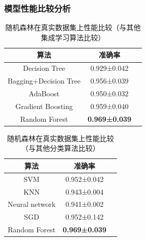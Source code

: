 \documentclass[10pt,aspectratio=43,mathserif]{beamer}
\begin{document}
          \begin{frame}
            \frametitle{\textbf{模型性能比较分析}}
            \begin{table}[]
                \caption{随机森林在真实数据集上性能比较（与其他集成学习算法比较）}
                \label{compare_ensemble}
                \centering
                \begin{tabular}{ccc}
                \hline
                算法                    & 准确率     \\ \hline
                Decision Tree         & 0.929±0.042          \\ 
                Bagging+Decision Tree & 0.956±0.039          \\
                AdaBoost              & 0.950±0.032          \\
                Gradient Boosting     & 0.959±0.040          \\ \hline
                Random Forest         & \textbf{0.969±0.039} \\ \hline
                \end{tabular}
            \end{table}

            \begin{table}[]
                \caption{随机森林在真实数据集上性能比较（与其他分类算法比较）}
                \label{compare_other}
                \centering
                \begin{tabular}{ccc}
                \hline
                算法             & 准确率                      \\ \hline
                SVM            & 0.952±0.042          \\
                KNN            & 0.943±0.004        \\
                Neural network & 0.941±0.002         \\
                SGD            & 0.952±0.142         \\ \hline
                Random Forest             & \textbf{0.969±0.039} \\ \hline
                \end{tabular}
            \end{table}

          \end{frame}
\end{document}

